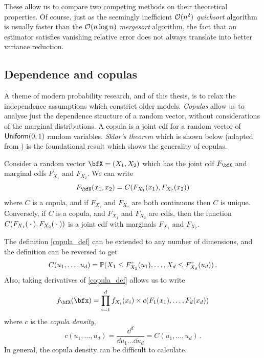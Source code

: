 These allow us to compare two competing methods on their theoretical properties. Of course, just as the seemingly inefficient ${\mathcal{O}}(n^2)$ \emph{quicksort} algorithm is usually faster than the ${\mathcal{O}}(n \log n)$ \emph{mergesort} algorithm, the fact that an estimator satisfies vanishing relative error does not always translate into better variance reduction.

\subsection{Dependence and copulas}

A theme of modern probability research, and of this thesis, is to relax the independence assumptions which constrict older models. \emph{Copulas} allow us to analyse just the dependence structure of a random vector, without considerations of the marginal distributions. A copula is a joint cdf for a random vector of $\mathsf{Uniform}(0,1)$ random variables. \emph{Sklar's theorem} which is shown below (adapted from \cite{nelsen2006introduction}) is the foundational result which shows the generality of copulas.

\begin{theorem}

Consider a random vector $\bfX=(X_1,X_2)$ which has the joint cdf $F_{\bfX}$ and marginal cdfs $F_{X_1}$ and $F_{X_2}$. We can write
\begin{equation} \label{copula_def}
F_{\bfX}(x_1, x_2) = C( F_{X_1}(x_1), F_{X_2}(x_2) )
\end{equation}
where $C$ is a copula, and if $F_{X_1}$ and $F_{X_2}$ are both continuous then $C$ is unique. Conversely, if $C$ is a copula, and $F_{X_1}$ and $F_{X_2}$ are cdfs, then the function $ C( F_{X_1}({}\cdot{}), F_{X_2}({}\cdot{}) )$ is a joint cdf with marginals $F_{X_1}$ and $F_{X_2}$.

\end{theorem}

The definition \eqref{copula_def} can be extended to any number of dimensions, and the definition can be reversed to get
\begin{equation} \label{cop_first}
C(u_1, \dots, u_d) = \Prob(X_1\le F_{X_1}^{{\ginv}}(u_1), \dots, X_d \le F_{X_d}^{\ginv}(u_d))  \,.
\end{equation}
Also, taking derivatives of \eqref{copula_def} allows us to write
\[ f_{\bfX}(\bfx) = \prod_{i=1}^d f_{X_i}(x_i) \times c(F_1(x_1), \dots, F_d(x_d)) \]
where $c$ is the \emph{copula density},
\[ c(u_1, \dots, u_d) = \frac{\dd^d}{\dd u_1 \dots \dd u_d} = C(u_1, \dots, u_d) \,. \]
In general, the copula density can be difficult to calculate.


